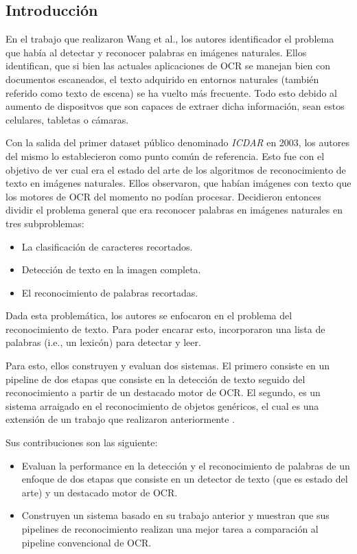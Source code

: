 \subsection{Introducción}

	En el trabajo que realizaron Wang et al., los autores identificador el problema que había al detectar y reconocer palabras en imágenes naturales. Ellos identifican, que si bien las actuales aplicaciones de OCR se manejan bien con documentos escaneados, el texto adquirido en entornos naturales (también referido como texto de escena) se ha vuelto más frecuente. Todo esto debido al aumento de dispositvos que son capaces de extraer dicha información, sean estos celulares, tabletas o cámaras.
	
	Con la salida del primer dataset público denominado \textit{ICDAR} en 2003, los autores del mismo lo establecieron como punto común de referencia. Esto fue con el objetivo de ver cual era el estado del arte de los algoritmos de reconocimiento de texto en imágenes naturales. Ellos observaron, que habían imágenes con texto que los motores de OCR del momento no podían procesar. Decidieron entonces dividir el problema general que era reconocer palabras en imágenes naturales en tres subproblemas:
	\begin{itemize}
		\item La clasificación de caracteres recortados.
		\item Detección de texto en la imagen completa.
		\item El reconocimiento de palabras recortadas.
	\end{itemize}
	
	Dada esta problemática, los autores se enfocaron en el problema del reconocimiento de texto. Para poder encarar esto, incorporaron una lista de palabras (i.e., un lexicón) para detectar y leer.
		
	Para esto, ellos construyen y evaluan dos sistemas. El primero consiste en un pipeline de dos etapas que consiste en la detección de texto seguido del reconocimiento a partir de un destacado motor de OCR. El segundo, es un sistema arraigado en el reconocimiento de objetos genéricos, el cual es una extensión de un trabajo que realizaron anteriormente \cite{WB10}.
	
	Sus contribuciones son las siguiente:
		\begin{itemize}
			\item Evaluan la performance en la detección y el reconocimiento de palabras de un enfoque de dos etapas que consiste en un detector de texto (que es estado del arte) y un destacado motor de OCR.
			\item Construyen un sistema basado en su trabajo anterior \cite{WB10} y muestran que sus pipelines de reconocimiento realizan una mejor tarea a comparación al pipeline convencional de OCR.
		\end{itemize}